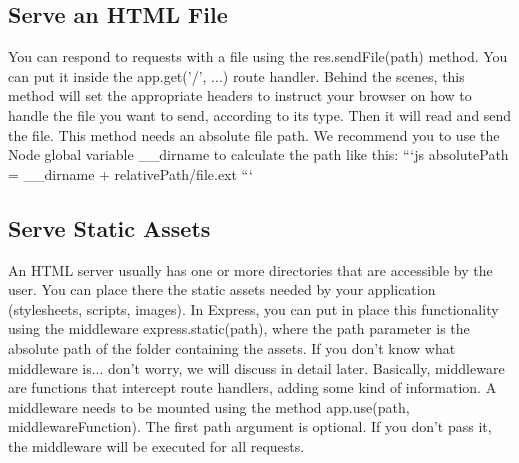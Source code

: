 \documentclass{article}%
\begin{document}
%
\subsection{Serve an HTML File}%
\label{subsec:ServeanHTMLFile}%
You can respond to requests with a file using the res.sendFile(path) method. You can put it inside the app.get('/', ...) route handler. Behind the scenes, this method will set the appropriate headers to instruct your browser on how to handle the file you want to send, according to its type. Then it will read and send the file. This method needs an absolute file path. We recommend you to use the Node global variable \_\_dirname to calculate the path like this:\newline%
```js\newline%
absolutePath = \_\_dirname + relativePath/file.ext\newline%
```\newline%

%
\subsection{Serve Static Assets}%
\label{subsec:ServeStaticAssets}%
An HTML server usually has one or more directories that are accessible by the user. You can place there the static assets needed by your application (stylesheets, scripts, images). In Express, you can put in place this functionality using the middleware express.static(path), where the path parameter is the absolute path of the folder containing the assets. If you don’t know what middleware is... don’t worry, we will discuss in detail later. Basically, middleware are functions that intercept route handlers, adding some kind of information. A middleware needs to be mounted using the method app.use(path, middlewareFunction). The first path argument is optional. If you don’t pass it, the middleware will be executed for all requests.\newline%

%
\end{document}
